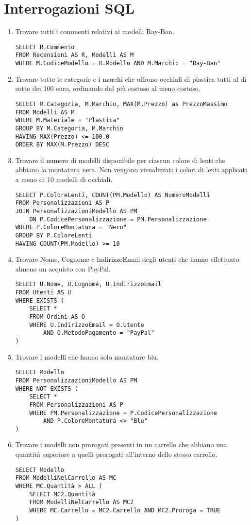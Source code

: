\section{Interrogazioni SQL}

\begin{enumerate}[label=\Alph*.]
	\item Trovare tutti i commenti relativi ai modelli Ray-Ban.
	      \begin{verbatim}
SELECT R.Commento
FROM Recensioni AS R, Modelli AS M
WHERE M.CodiceModello = R.Modello AND M.Marchio = "Ray-Ban"
	\end{verbatim}
	\item Trovare tutte le categorie e i marchi che offrono occhiali di plastica tutti al di sotto
	      dei 100 euro, ordinando dal più costoso al meno costoso.
	      \begin{verbatim}
SELECT M.Categoria, M.Marchio, MAX(M.Prezzo) as PrezzoMassimo
FROM Modelli AS M
WHERE M.Materiale = "Plastica"
GROUP BY M.Categoria, M.Marchio
HAVING MAX(Prezzo) <= 100.0
ORDER BY MAX(M.Prezzo) DESC
\end{verbatim}
	\item Trovare il numero di modelli disponibile per ciascun colore di lenti che abbiano la
	      montatura nera. Non vengono visualizzati i colori di lenti applicati a meno di 10
	      modelli di occhiali.
	      \begin{verbatim}
SELECT P.ColoreLenti, COUNT(PM.Modello) AS NumeroModelli
FROM Personalizzazioni AS P
JOIN PersonalizzazioniModello AS PM 
	ON P.CodicePersonalizzazione = PM.Personalizzazione
WHERE P.ColoreMontatura = "Nero"
GROUP BY P.ColoreLenti
HAVING COUNT(PM.Modello) >= 10
		  \end{verbatim}
	\item Trovare Nome, Cognome e IndirizzoEmail degli utenti che hanno effettuato almeno un
	      acquisto con PayPal.
	      \begin{verbatim}
SELECT U.Nome, U.Cognome, U.IndirizzoEmail
FROM Utenti AS U
WHERE EXISTS (
	SELECT *
	FROM Ordini AS O
	WHERE U.IndirizzoEmail = O.Utente
		AND O.MetodoPagamento = "PayPal"
)
	\end{verbatim}
	      \newpage
	\item Trovare i modelli che hanno solo montature blu.
	      \begin{verbatim}
SELECT Modello
FROM PersonalizzazioniModello AS PM
WHERE NOT EXISTS (
	SELECT *
	FROM Personalizzazioni AS P
	WHERE PM.Personalizzazione = P.CodicePersonalizzazione 
		AND P.ColoreMontatura <> "Blu"
)
\end{verbatim}
	\item Trovare i modelli non prorogati presenti in un carrello che abbiano una quantità
	      superiore a quelli prorogati all'interno dello stesso carrello.
	      \begin{verbatim}
SELECT Modello
FROM ModelliNelCarrello AS MC
WHERE MC.Quantità > ALL (
    SELECT MC2.Quantità
    FROM ModelliNelCarrello AS MC2
	WHERE MC.Carrello = MC2.Carrello AND MC2.Proroga = TRUE
)
	\end{verbatim}
\end{enumerate}
